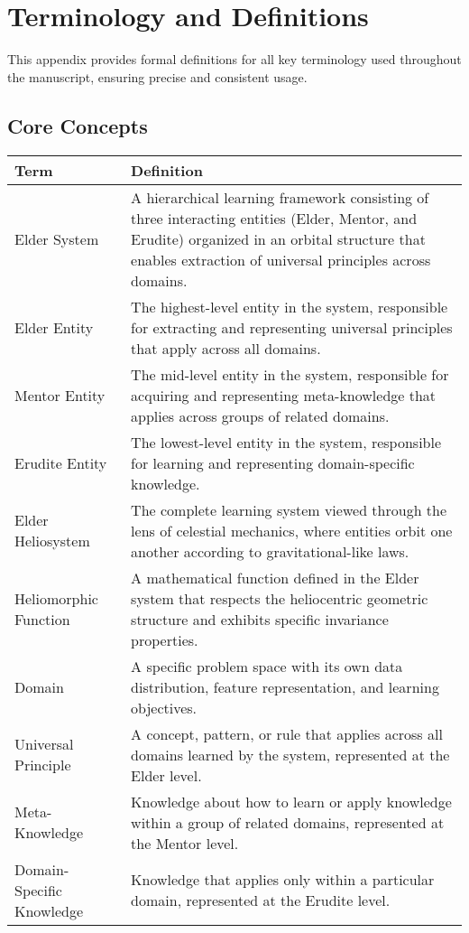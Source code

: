 \chapter{Terminology and Definitions}

This appendix provides formal definitions for all key terminology used throughout the manuscript, ensuring precise and consistent usage.

\section{Core Concepts}

\begin{center}
\begin{tabular}{|l|p{12cm}|}
\hline
\textbf{Term} & \textbf{Definition} \\
\hline
Elder System & A hierarchical learning framework consisting of three interacting entities (Elder, Mentor, and Erudite) organized in an orbital structure that enables extraction of universal principles across domains. \\
\hline
Elder Entity & The highest-level entity in the system, responsible for extracting and representing universal principles that apply across all domains. \\
\hline
Mentor Entity & The mid-level entity in the system, responsible for acquiring and representing meta-knowledge that applies across groups of related domains. \\
\hline
Erudite Entity & The lowest-level entity in the system, responsible for learning and representing domain-specific knowledge. \\
\hline
Elder Heliosystem & The complete learning system viewed through the lens of celestial mechanics, where entities orbit one another according to gravitational-like laws. \\
\hline
Heliomorphic Function & A mathematical function defined in the Elder system that respects the heliocentric geometric structure and exhibits specific invariance properties. \\
\hline
Domain & A specific problem space with its own data distribution, feature representation, and learning objectives. \\
\hline
Universal Principle & A concept, pattern, or rule that applies across all domains learned by the system, represented at the Elder level. \\
\hline
Meta-Knowledge & Knowledge about how to learn or apply knowledge within a group of related domains, represented at the Mentor level. \\
\hline
Domain-Specific Knowledge & Knowledge that applies only within a particular domain, represented at the Erudite level. \\
\hline
\end{tabular}
\label{tab:core_terminology}
\end{center}

